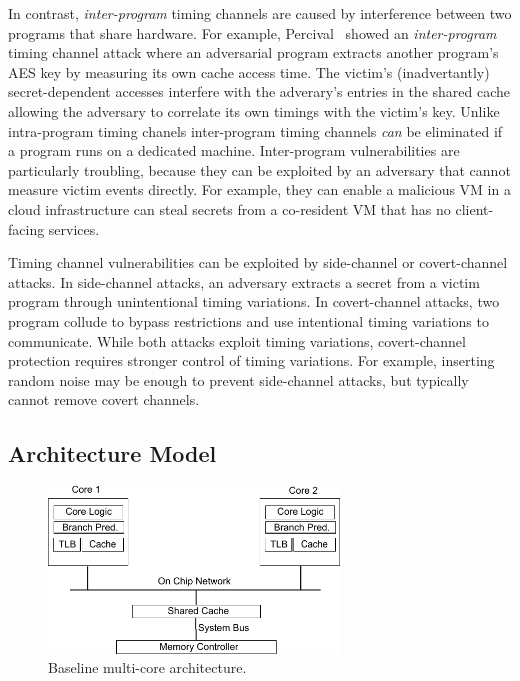 In contrast, {\em inter-program} timing channels are caused by interference 
between two programs that share hardware.
For example, Percival~\cite{percival} showed an {\em inter-program} timing 
channel attack where an adversarial program extracts another program's AES key
by measuring its own cache access time. The victim's (inadvertantly)
secret-dependent accesses interfere with the adverary's entries in the shared
cache allowing the adversary to correlate its own timings with the victim's key. 
Unlike intra-program timing chanels inter-program timing channels {\em can} be
eliminated if a program runs on a dedicated machine. Inter-program 
vulnerabilities are particularly troubling, because they can be exploited by an 
adversary that cannot measure victim events directly. For example, they can 
enable a malicious VM in a cloud infrastructure can steal secrets from a
co-resident VM that has no client-facing services.

Timing channel vulnerabilities can be exploited by side-channel or 
covert-channel attacks. In side-channel attacks, an adversary extracts a secret from
a victim program through unintentional timing variations.
In covert-channel attacks, two program collude to bypass restrictions and use
intentional timing variations to communicate.
While both attacks exploit timing variations, covert-channel protection requires
stronger control of timing variations. For example, inserting random noise may be
enough to prevent side-channel attacks, but typically cannot remove covert channels.

\subsection{Architecture Model}


    \begin{figure}
        \begin{center}
            \includegraphics[width=3.04in]{figs/baseline.pdf}
            \caption{Baseline multi-core architecture.}
            \label{fig:baseline}
        \end{center}
    \end{figure}

